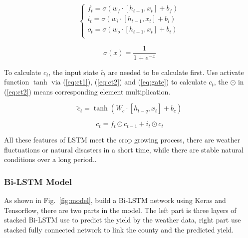 \documentclass[conference]{IEEEtran}
\begin{document}
      \begin{equation}
        \begin{cases}	f_t=\sigma \left( w_f\cdot \left[ h_{t-1},x_t \right] +b_f \right)\\	i_t=\sigma \left( w_i\cdot \left[ h_{t-1},x_t \right] +b_i \right)\\	o_t=\sigma \left( w_o\cdot \left[ h_{t-1},x_t \right] +b_i \right)\\\end{cases}
        \label{eq:gate}
      \end{equation}

      \begin{equation}
        \sigma \left( x \right) =\frac{1}{1+e^{-x}}
        \label{eq:sigmoid}
      \end{equation}

      To calculate $c_t$, the input state $\widetilde{c_t}$ are needed to be calculate first. Use activate function $\tanh$ via (\ref{eq:ct1}), (\ref{eq:ct2}) and (\ref{eq:gate}) to calculate $c_t$, the $\odot$ in (\ref{eq:ct2}) means corresponding element multiplication.

      \begin{equation}
        \tilde{c}_t=\tanh \left( W_c\cdot \left[ h_{t-q},x_t \right] +b_c \right)
        \label{eq:ct1}
      \end{equation}

      \begin{equation}
        c_t=f_t\odot c_{t-1}+i_t\odot c_t
        \label{eq:ct2}
      \end{equation}

      All these features of LSTM meet the crop growing process, there are weather fluctuations or natural disasters in a short time, while there are stable natural conditions over a long period..

    \subsubsection{Bi-LSTM Model}
      As shown in Fig.~\ref{fig:model}, build a Bi-LSTM network using Keras and Tensorflow, there are two parts in the model. The left part is three layers of stacked Bi-LSTM use to predict the yield by the weather data, right part use stacked fully connected network to link the county and the predicted yield.
\end{document}
